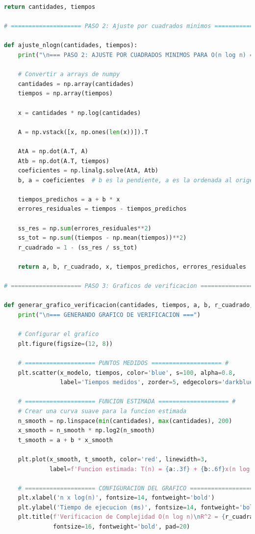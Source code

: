 \begin{lstlisting}[language=Python, caption=Código para ajuste por mínimos cuadrados]
    return cantidades, tiempos

# ==================== PASO 2: Ajuste por cuadrados minimos ==================== #

def ajuste_nlogn(cantidades, tiempos):
    print("\n=== PASO 2: AJUSTE POR CUADRADOS MINIMOS PARA O(n log n) ===")
    
    # Convertir a arrays de numpy
    cantidades = np.array(cantidades)
    tiempos = np.array(tiempos)
    
    x = cantidades * np.log(cantidades)

    A = np.vstack([x, np.ones(len(x))]).T

    AtA = np.dot(A.T, A)
    Atb = np.dot(A.T, tiempos)
    coeficientes = np.linalg.solve(AtA, Atb)
    b, a = coeficientes  # b es la pendiente, a es la ordenada al origen
    
    tiempos_predichos = a + b * x
    errores_residuales = tiempos - tiempos_predichos

    ss_res = np.sum(errores_residuales**2)
    ss_tot = np.sum((tiempos - np.mean(tiempos))**2)
    r_cuadrado = 1 - (ss_res / ss_tot)

    return a, b, r_cuadrado, x, tiempos_predichos, errores_residuales

# ==================== PASO 3: Graficos de verificacion ==================== #

def generar_grafico_verificacion(cantidades, tiempos, a, b, r_cuadrado, x_modelo, t_predicho):
    print("\n=== GENERANDO GRAFICO DE VERIFICACION ===")
    
    # Configurar el grafico
    plt.figure(figsize=(12, 8))
    
    # ==================== PUNTOS MEDIDOS ==================== #
    plt.scatter(x_modelo, tiempos, color='blue', s=100, alpha=0.8, 
                label='Tiempos medidos', zorder=5, edgecolors='darkblue', linewidth=1)
    
    # ==================== FUNCION ESTIMADA ==================== #
    # Crear una curva suave para la funcion estimada
    n_smooth = np.linspace(min(cantidades), max(cantidades), 200)
    x_smooth = n_smooth * np.log2(n_smooth)
    t_smooth = a + b * x_smooth
    
    plt.plot(x_smooth, t_smooth, color='red', linewidth=3, 
             label=f'Funcion estimada: T(n) = {a:.3f} + {b:.6f}x(n log n)')
    
    # ==================== CONFIGURACION DEL GRAFICO ==================== #
    plt.xlabel('n x log(n)', fontsize=14, fontweight='bold')
    plt.ylabel('Tiempo de ejecucion (ms)', fontsize=14, fontweight='bold')
    plt.title(f'Verificacion de Complejidad O(n log n)\nR^2 = {r_cuadrado:.6f}', 
              fontsize=16, fontweight='bold', pad=20)
    

\end{lstlisting}
